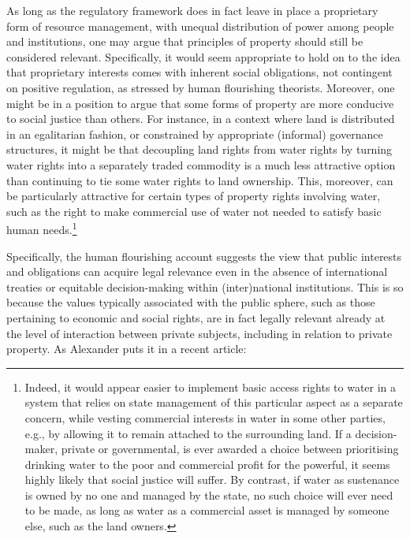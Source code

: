 {As long as the regulatory framework does in fact leave in place a proprietary form of resource management, with unequal distribution of power among people and institutions, one may argue that principles of property should still be considered relevant. Specifically, it would seem appropriate to hold on to the idea that proprietary interests comes with inherent social obligations, not contingent on positive regulation, as stressed by human flourishing theorists. Moreover, one might be in a position to argue that some forms of property are more conducive to social justice than others. For instance, in a context where land is distributed in an egalitarian fashion, or constrained by appropriate (informal) governance structures, it might be that decoupling land rights from water rights by turning water rights into a separately traded commodity is a much less attractive option than continuing to tie some water rights to land ownership. This, moreover, can be particularly attractive for certain types of property rights involving water, such as the right to make commercial use of water not needed to satisfy basic human needs.\footnote{Indeed, it would appear easier to implement basic access rights to water in a system that relies on state management of this particular aspect as a separate concern, while vesting commercial interests in water in some other parties, e.g., by allowing it to remain attached to the surrounding land. If a decision-maker, private or governmental, is ever awarded a choice between prioritising drinking water to the poor and commercial profit for the powerful, it seems highly likely that social justice will suffer. By contrast, if water as sustenance  is owned by no one and managed by the state, no such choice will ever need to be made, as long as water as a commercial asset is managed by someone else, such as the land owners.}}

Specifically, the human flourishing account suggests the view that public interests and obligations can acquire legal relevance even in the absence of international treaties or equitable decision-making within (inter)national institutions. This is so because the values typically associated with the public sphere, such as those pertaining to economic and social rights, are in fact legally relevant already at the level of interaction between private subjects, including in relation to private property. As Alexander puts it in a recent article:

